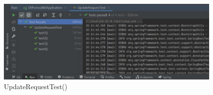             \begin{figure}[H]
                 \includegraphics[width=\textwidth, height=\textheight, keepaspectratio]{slike/UpdateRequestTest.jpeg}
                \cntering
                \caption{UpdateRequestTest()}
            \end{figure}
            
